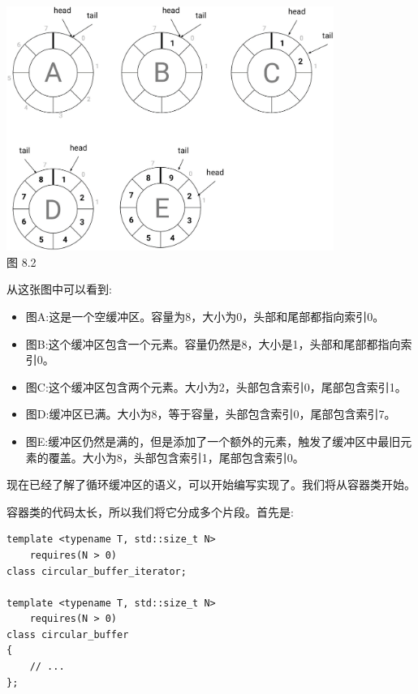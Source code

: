 \begin{center}
\includegraphics[width=0.8\textwidth]{content/3/chapter8/images/2.png}\\
图 8.2
\end{center}

从这张图中可以看到:

\begin{itemize}
\item
图A:这是一个空缓冲区。容量为8，大小为0，头部和尾部都指向索引0。

\item
图B:这个缓冲区包含一个元素。容量仍然是8，大小是1，头部和尾部都指向索引0。

\item
图C:这个缓冲区包含两个元素。大小为2，头部包含索引0，尾部包含索引1。

\item
图D:缓冲区已满。大小为8，等于容量，头部包含索引0，尾部包含索引7。

\item
图E:缓冲区仍然是满的，但是添加了一个额外的元素，触发了缓冲区中最旧元素的覆盖。大小为8，头部包含索引1，尾部包含索引0。
\end{itemize}

现在已经了解了循环缓冲区的语义，可以开始编写实现了。我们将从容器类开始。


容器类的代码太长，所以我们将它分成多个片段。首先是:

\begin{lstlisting}[style=styleCXX]
template <typename T, std::size_t N>
	requires(N > 0)
class circular_buffer_iterator;

template <typename T, std::size_t N>
	requires(N > 0)
class circular_buffer
{
	// ...
};
\end{lstlisting}

